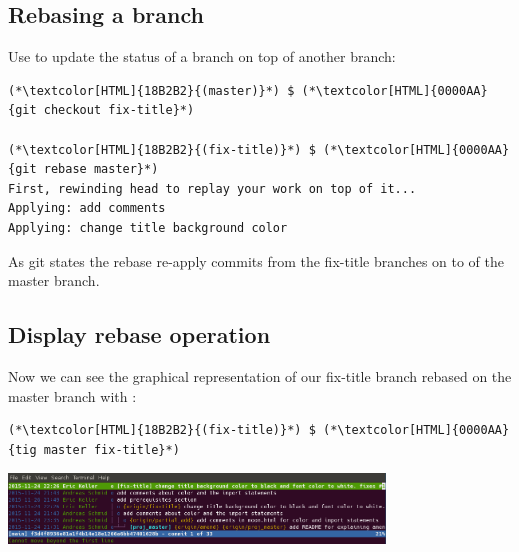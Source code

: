 \subsection{Rebasing a branch}
\begin{frame}[fragile]
  \subslidetitle

  Use  to update the status of a branch on top of another branch:

  \begin{lstlisting}
(*\textcolor[HTML]{18B2B2}{(master)}*) $ (*\textcolor[HTML]{0000AA}{git checkout fix-title}*)

(*\textcolor[HTML]{18B2B2}{(fix-title)}*) $ (*\textcolor[HTML]{0000AA}{git rebase master}*)
First, rewinding head to replay your work on top of it...
Applying: add comments
Applying: change title background color
\end{lstlisting}

  As git states the rebase re-apply commits from the fix-title branches on to of the master branch.

\end{frame}

\subsection{Display rebase operation}
\begin{frame}[fragile]
  \subslidetitle

  Now we can see the graphical representation of our fix-title branch rebased on the master branch with :
  \begin{lstlisting}
(*\textcolor[HTML]{18B2B2}{(fix-title)}*) $ (*\textcolor[HTML]{0000AA}{tig master fix-title}*)
\end{lstlisting}

  \vspace{1em}

  \centerline{\includegraphics[width=10cm]{../screen/tig-fix-title-rebase-master.png}}

\end{frame}

